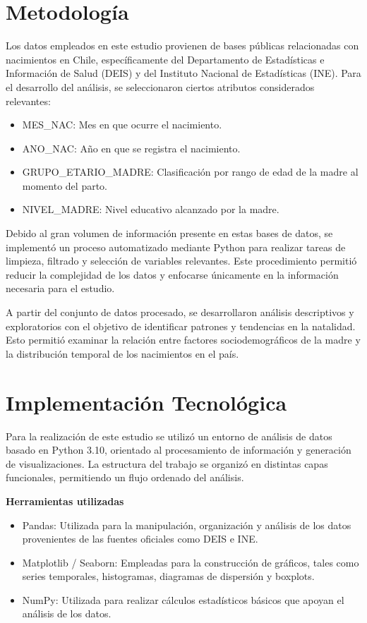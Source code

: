 \documentclass[runningheads]{llncs}
\begin{document}
\section{Metodología}

Los datos empleados en este estudio provienen de bases públicas relacionadas con nacimientos en Chile, específicamente del Departamento de Estadísticas e Información de Salud (DEIS) y del Instituto Nacional de Estadísticas (INE). Para el desarrollo del análisis, se seleccionaron ciertos atributos considerados relevantes:

\begin{itemize}
    \item MES\_NAC: Mes en que ocurre el nacimiento.
    \item ANO\_NAC: Año en que se registra el nacimiento.
    \item GRUPO\_ETARIO\_MADRE: Clasificación por rango de edad de la madre al momento del parto.
    \item NIVEL\_MADRE: Nivel educativo alcanzado por la madre.
\end{itemize}

Debido al gran volumen de información presente en estas bases de datos, se implementó un proceso automatizado mediante Python para realizar tareas de limpieza, filtrado y selección de variables relevantes. Este procedimiento permitió reducir la complejidad de los datos y enfocarse únicamente en la información necesaria para el estudio.

A partir del conjunto de datos procesado, se desarrollaron análisis descriptivos y exploratorios con el objetivo de identificar patrones y tendencias en la natalidad. Esto permitió examinar la relación entre factores sociodemográficos de la madre y la distribución temporal de los nacimientos en el país.

\section{Implementación Tecnológica}

Para la realización de este estudio se utilizó un entorno de análisis de datos basado en Python 3.10, orientado al procesamiento de información y generación de visualizaciones. La estructura del trabajo se organizó en distintas capas funcionales, permitiendo un flujo ordenado del análisis.

\textbf{Herramientas utilizadas}

\begin{itemize}
    \item Pandas: Utilizada para la manipulación, organización y análisis de los datos provenientes de las fuentes oficiales como DEIS e INE.
    \item Matplotlib / Seaborn: Empleadas para la construcción de gráficos, tales como series temporales, histogramas, diagramas de dispersión y boxplots.
    \item NumPy: Utilizada para realizar cálculos estadísticos básicos que apoyan el análisis de los datos.
\end{itemize}
\end{document}

